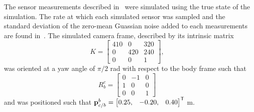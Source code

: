 The sensor measurements described in~ were
simulated using the true state of the simulation. The rate at which each
simulated sensor was sampled and the standard deviation of the zero-mean
Guassian noise added to each measurements are found
in~.
The 
simulated camera frame, described by its intrinsic matrix
\begin{equation}
  K =
  \begin{bmatrix}
    410 & 0 & 320 \\
    0 & 420 & 240 \\
    0& 0 & 1
  \end{bmatrix},
\end{equation}
was oriented at a yaw angle of $\pi/2$ rad with respect to the body
frame such that
\begin{equation}
  R_b^c =
  \begin{bmatrix}
    0 & -1 & 0 \\
    1 & 0 & 0 \\
    0 & 0 & 1
  \end{bmatrix}
\end{equation}
and was positioned such that $\boldsymbol{\mathrm{p}}_{c/b}^b = \begin{bmatrix}0.25, & -0.20, &
0.40 \end{bmatrix}^{\mathsf{T}}$ m.

